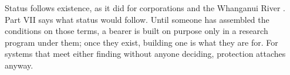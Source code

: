 Status follows existence, as it did for corporations and the Whanganui River \autocite{nzparliament2017teawatupua}. Part VII says what status would follow. Until someone has assembled the conditions on those terms, a bearer is built on purpose only in a research program under them; once they exist, building one is what they are for. For systems that meet either finding without anyone deciding, protection attaches anyway.
